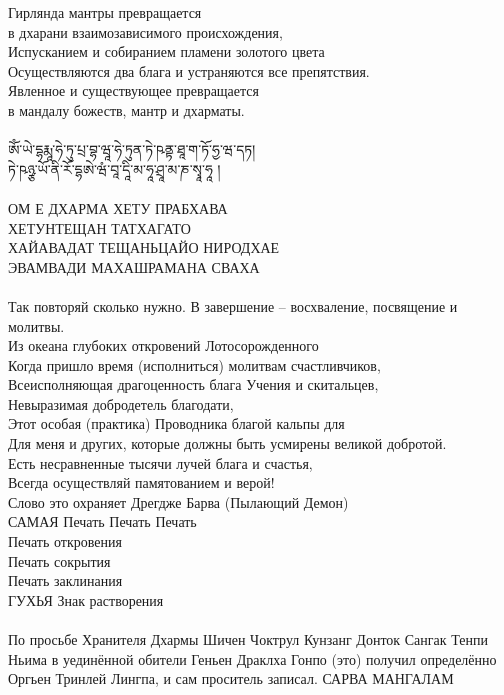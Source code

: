 \newpage
Гирлянда мантры превращается \\ \indent в дхарани взаимозависимого происхождения,\\
Испусканием и собиранием пламени золотого цвета\\
Осуществляются два блага и устраняются все препятствия.\\
Явленное и существующее превращается \\ \indent в мандалу божеств, мантр и дхарматы.\\
\\
\ti
ཨོཾ་ཡེ་དྷརྨཱ་ཧེ་ཏུ་པྲ་བྷ་ཝཱ་ཧེ་ཏུན་ཏེ་ཥནྟ་ཐཱ་ག་ཏོ་ཧྱ་ཝ་དཏ།\\
ཏེ་ཥཉྩ་ཡོ་ནི་རོ་དྷཨེ་ཝཾ་བཱ་དཱི་མ་ཧཱ་ཤྲཱ་མ་ཎ་སྭཱ་ཧཱ །\\
\\
\ru ОМ Е ДХАРМА ХЕТУ ПРАБХАВА \\
ХЕТУНТЕЩАН ТАТХАГАТО \\
ХАЙАВАДАТ ТЕЩАНЬЦАЙО НИРОДХАЕ\\
ЭВАМВАДИ МАХАШРАМАНА СВАХА\\
\\
\scriptsize
Так повторяй сколько нужно. В завершение – восхваление, посвящение и молитвы.\\
Из океана глубоких откровений Лотосорожденного\\
Когда пришло время (исполниться) молитвам счастливчиков,\\
Всеисполняющая драгоценность блага Учения и скитальцев,\\
Невыразимая добродетель благодати,\\
Этот особая (практика) Проводника благой кальпы для\\
Для меня и других, которые должны быть усмирены великой добротой.\\
Есть несравненные тысячи лучей блага и счастья,\\
Всегда осуществляй памятованием и верой!\\
Слово это охраняет Дрегдже Барва (Пылающий Демон)\\
САМАЯ Печать Печать Печать \\
Печать откровения \\
Печать сокрытия \\
Печать заклинания \\
ГУХЬЯ Знак растворения\\
\\
По просьбе Хранителя Дхармы Шичен Чоктрул Кунзанг Донток Сангак Тенпи Ньима 
в уединённой обители Геньен Драклха Гонпо (это) получил определённо 
Оргьен Тринлей Лингпа, и сам проситель записал. САРВА МАНГАЛАМ\\
\normalsize
\newpage
